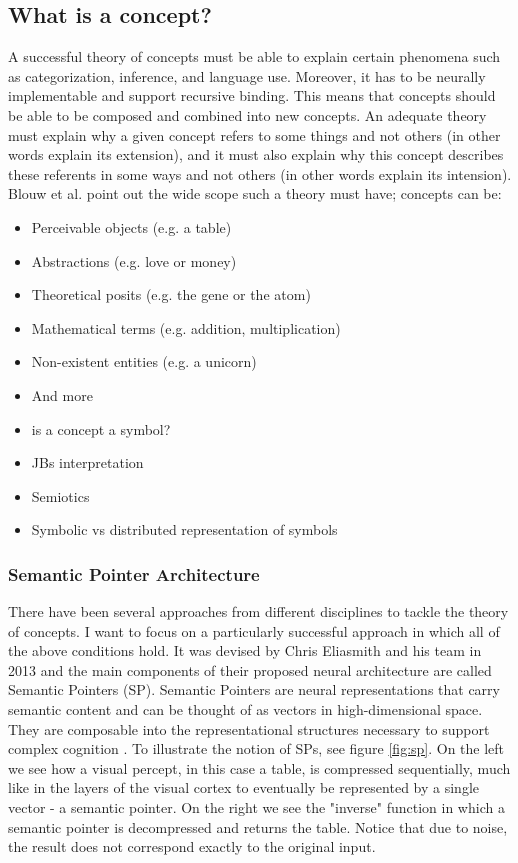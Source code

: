 \subsection{What is a concept?}
A successful theory of concepts must be able to explain certain phenomena such as categorization, inference, and language use. Moreover, it has to be neurally implementable and support recursive binding. This means that concepts should be able to be composed and combined into new concepts. An adequate theory must explain why a given concept refers to some things and not others (in other words explain its extension), and it must also explain why this concept describes these referents in some ways and not others (in other words explain its intension). Blouw et al. \cite{blouw2016concepts} point out the wide scope such a theory must have; concepts can be:
\begin{itemize}
    \item Perceivable objects (e.g. a table)
    \item Abstractions (e.g. love or money)
    \item Theoretical posits (e.g. the gene or the atom)
    \item Mathematical terms (e.g. addition, multiplication)
    \item Non-existent entities (e.g. a unicorn)
    \item And more
\end{itemize}

\begin{itemize}
    \item is a concept a symbol? 
    \item JBs interpretation
    \item Semiotics
    \item Symbolic vs distributed representation of symbols
\end{itemize}


\subsubsection{Semantic Pointer Architecture}
    There have been several approaches from different disciplines to tackle the theory of concepts. I want to focus on a particularly successful approach in which all of the above conditions hold. It was devised by Chris Eliasmith and his team in 2013 and the main components of their proposed neural architecture are called Semantic Pointers (SP). Semantic Pointers are neural representations that carry semantic content and can be thought of as vectors in high-dimensional space. They are composable into the representational structures necessary to support complex cognition \cite{eliasmith2013build}. To illustrate the notion of SPs, see figure \ref{fig:sp}. On the left we see how a visual percept, in this case a table, is compressed sequentially, much like in the layers of the visual cortex to eventually be represented by a single vector - a semantic pointer. 
    On the right we see the "inverse" function in which a semantic pointer is decompressed and returns the table. Notice that due to noise, the result does not correspond exactly to the original input. 

